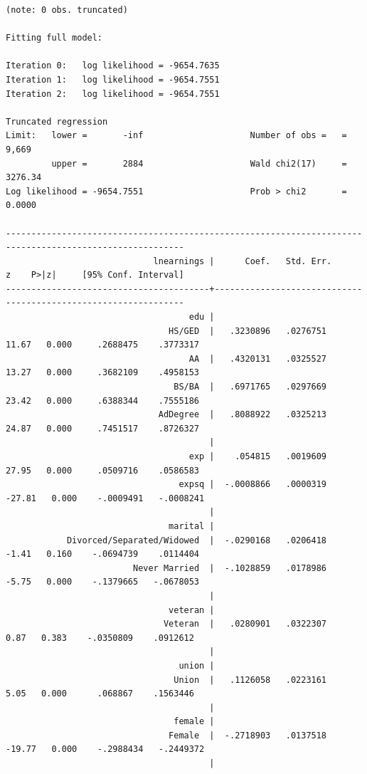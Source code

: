 \documentclass[
]{book}
\begin{document}
\begin{verbatim}
(note: 0 obs. truncated)

Fitting full model:

Iteration 0:   log likelihood = -9654.7635  
Iteration 1:   log likelihood = -9654.7551  
Iteration 2:   log likelihood = -9654.7551  

Truncated regression
Limit:   lower =       -inf                     Number of obs =   =      9,669
         upper =       2884                     Wald chi2(17)     =    3276.34
Log likelihood = -9654.7551                     Prob > chi2       =     0.0000

---------------------------------------------------------------------------------------------------------
                             lnearnings |      Coef.   Std. Err.      z    P>|z|     [95% Conf. Interval]
----------------------------------------+----------------------------------------------------------------
                                    edu |
                                HS/GED  |   .3230896   .0276751    11.67   0.000     .2688475    .3773317
                                    AA  |   .4320131   .0325527    13.27   0.000     .3682109    .4958153
                                 BS/BA  |   .6971765   .0297669    23.42   0.000     .6388344    .7555186
                              AdDegree  |   .8088922   .0325213    24.87   0.000     .7451517    .8726327
                                        |
                                    exp |    .054815   .0019609    27.95   0.000     .0509716    .0586583
                                  expsq |  -.0008866   .0000319   -27.81   0.000    -.0009491   -.0008241
                                        |
                                marital |
            Divorced/Separated/Widowed  |  -.0290168   .0206418    -1.41   0.160    -.0694739    .0114404
                         Never Married  |  -.1028859   .0178986    -5.75   0.000    -.1379665   -.0678053
                                        |
                                veteran |
                               Veteran  |   .0280901   .0322307     0.87   0.383    -.0350809    .0912612
                                        |
                                  union |
                                 Union  |   .1126058   .0223161     5.05   0.000      .068867    .1563446
                                        |
                                 female |
                                Female  |  -.2718903   .0137518   -19.77   0.000    -.2988434   -.2449372
                                        |

\end{verbatim}
\end{document}
